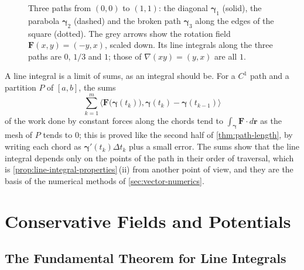\begin{figure}
{}{Three paths from $(0,0)$ to $(1,1)$: the diagonal $\boldsymbol\gamma_1$ (solid), the parabola $\boldsymbol\gamma_2$ (dashed) and the broken path $\boldsymbol\gamma_3$ along the edges of the square (dotted). The grey arrows show the rotation field $\mathbf F(x,y)=(-y,x)$, scaled down. Its line integrals along the three paths are $0$, $1/3$ and $1$; those of $\nabla(xy)=(y,x)$ are all $1$.\label{fig:paths}}
\end{figure}

A line integral is a limit of sums, as an integral should be. For a $C^1$ path and a partition $P$ of $[a,b]$, the sums
\[
\sum_{k=1}^m\bigl\langle\mathbf F\bigl(\boldsymbol\gamma(t_k)\bigr),\boldsymbol\gamma(t_k)-\boldsymbol\gamma(t_{k-1})\bigr\rangle
\]
of the work done by constant forces along the chords tend to $\int_{\boldsymbol\gamma}\mathbf F\cdot d\mathbf r$ as the mesh of $P$ tends to $0$; this is proved like the second half of \cref{thm:path-length}, by writing each chord as $\boldsymbol\gamma'(t_k)\Delta t_k$ plus a small error. The sums show that the line integral depends only on the points of the path in their order of traversal, which is \cref{prop:line-integral-properties}\,(ii) from another point of view, and they are the basis of the numerical methods of \cref{sec:vector-numerics}.

\section{Conservative Fields and Potentials}
\label{sec:conservative}

\subsection{The Fundamental Theorem for Line Integrals}

